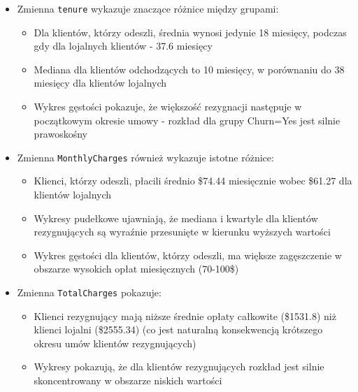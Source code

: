 \documentclass[12pt, a4paper]{article}\usepackage[]{graphicx}\usepackage[]{xcolor}
\begin{document}
\begin{itemize}
  \item Zmienna \texttt{tenure} wykazuje znaczące różnice między grupami:
  \begin{itemize}
    \item Dla klientów, którzy odeszli, średnia wynosi jedynie 18 miesięcy, podczas gdy dla lojalnych klientów - 37.6 miesięcy
    \item Mediana dla klientów odchodzących to 10 miesięcy, w porównaniu do 38 miesięcy dla klientów lojalnych
    \item Wykres gęstości pokazuje, że większość rezygnacji następuje w początkowym okresie umowy - rozkład dla grupy Churn=Yes jest silnie prawoskośny
  \end{itemize}
  
  \item Zmienna \texttt{MonthlyCharges} również wykazuje istotne różnice:
  \begin{itemize}
    \item Klienci, którzy odeszli, płacili średnio \$74.44 miesięcznie wobec \$61.27 dla klientów lojalnych
    \item Wykresy pudełkowe ujawniają, że mediana i kwartyle dla klientów rezygnujących są wyraźnie przesunięte w kierunku wyższych wartości
    \item Wykres gęstości dla klientów, którzy odeszli, ma większe zagęszczenie w obszarze wysokich opłat miesięcznych (70-100\$)
  \end{itemize}
  
  \item Zmienna \texttt{TotalCharges} pokazuje:
  \begin{itemize}
    \item Klienci rezygnujący mają niższe średnie opłaty całkowite (\$1531.8) niż klienci lojalni (\$2555.34) (co jest naturalną konsekwencją krótszego okresu umów klientów rezygnujących)
    \item Wykresy pokazują, że dla klientów rezygnujących rozkład jest silnie skoncentrowany w obszarze niskich wartości
  \end{itemize}
\end{itemize}


\newpage
\end{document}
